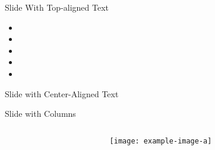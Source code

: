 
\begin{frame}[t]{Slide With Top-aligned Text}
  \lipsum[1][1-3]
  \begin{itemize}
    \item \lipsum[2][1]
    \item \lipsum[2][2]
    \item \lipsum[2][3]
    \item \lipsum[2][4]
    \item \lipsum[2][5]
  \end{itemize}
\end{frame}
  
\begin{frame}{Slide with Center-Aligned Text}
  \lipsum[2]
\end{frame}
  
\begin{frame}[t]{Slide with Columns}

  \begin{minipage}[t][\textheight][t]{\linewidth}
    \begin{columns}
      \begin{column}[T]{0.48\textwidth}
        \lipsum[3][1-10]
      \end{column}
      \hfill
      \begin{column}[T]{0.48\textwidth}
        \lipsum[4][1]
        \begin{center}
          \texttt{[image: example-image-a]}
        \end{center}
        \lipsum[4][2-5]
      \end{column}
    \end{columns}
  \end{minipage}

\end{frame}


